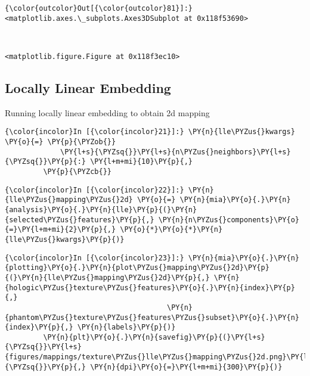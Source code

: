             \begin{Verbatim}[commandchars=\\\{\}]
{\color{outcolor}Out[{\color{outcolor}81}]:} <matplotlib.axes.\_subplots.Axes3DSubplot at 0x118f53690>
\end{Verbatim}

    \begin{center}
    \end{center}
    { \hspace*{\fill} \\}


    \begin{verbatim}
<matplotlib.figure.Figure at 0x118f3ec10>
    \end{verbatim}


    \subsection{Locally Linear Embedding}\label{locally-linear-embedding}

Running locally linear embedding to obtain 2d mapping

    \begin{Verbatim}[commandchars=\\\{\}]
{\color{incolor}In [{\color{incolor}21}]:} \PY{n}{lle\PYZus{}kwargs} \PY{o}{=} \PY{p}{\PYZob{}}
             \PY{l+s}{\PYZsq{}}\PY{l+s}{n\PYZus{}neighbors}\PY{l+s}{\PYZsq{}}\PY{p}{:} \PY{l+m+mi}{10}\PY{p}{,}
         \PY{p}{\PYZcb{}}
\end{Verbatim}

    \begin{Verbatim}[commandchars=\\\{\}]
{\color{incolor}In [{\color{incolor}22}]:} \PY{n}{lle\PYZus{}mapping\PYZus{}2d} \PY{o}{=} \PY{n}{mia}\PY{o}{.}\PY{n}{analysis}\PY{o}{.}\PY{n}{lle}\PY{p}{(}\PY{n}{selected\PYZus{}features}\PY{p}{,} \PY{n}{n\PYZus{}components}\PY{o}{=}\PY{l+m+mi}{2}\PY{p}{,} \PY{o}{*}\PY{o}{*}\PY{n}{lle\PYZus{}kwargs}\PY{p}{)}
\end{Verbatim}

    \begin{Verbatim}[commandchars=\\\{\}]
{\color{incolor}In [{\color{incolor}23}]:} \PY{n}{mia}\PY{o}{.}\PY{n}{plotting}\PY{o}{.}\PY{n}{plot\PYZus{}mapping\PYZus{}2d}\PY{p}{(}\PY{n}{lle\PYZus{}mapping\PYZus{}2d}\PY{p}{,} \PY{n}{hologic\PYZus{}texture\PYZus{}features}\PY{o}{.}\PY{n}{index}\PY{p}{,}
                                      \PY{n}{phantom\PYZus{}texture\PYZus{}features\PYZus{}subset}\PY{o}{.}\PY{n}{index}\PY{p}{,} \PY{n}{labels}\PY{p}{)}
         \PY{n}{plt}\PY{o}{.}\PY{n}{savefig}\PY{p}{(}\PY{l+s}{\PYZsq{}}\PY{l+s}{figures/mappings/texture\PYZus{}lle\PYZus{}mapping\PYZus{}2d.png}\PY{l+s}{\PYZsq{}}\PY{p}{,} \PY{n}{dpi}\PY{o}{=}\PY{l+m+mi}{300}\PY{p}{)}
\end{Verbatim}

